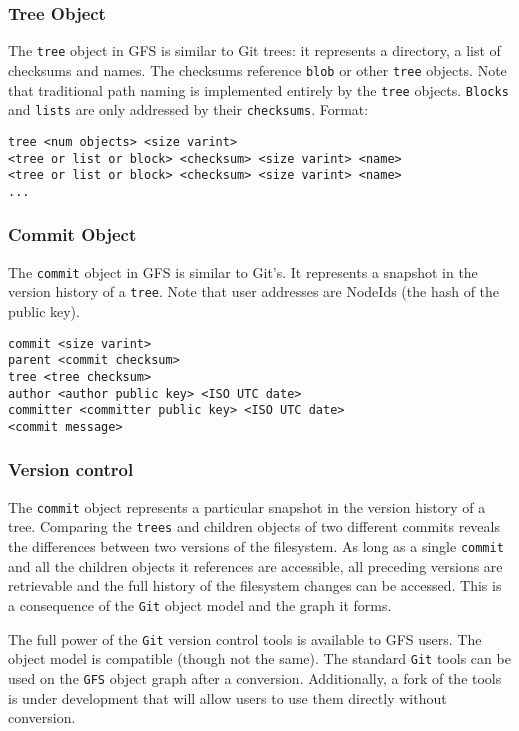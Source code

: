 \documentclass{sig-alternate}
\begin{document}
\subsubsection{Tree Object}

The \texttt{tree} object in GFS is similar to Git trees: it represents a
directory, a list of checksums and names. The checksums reference \texttt{blob}
or other \texttt{tree} objects. Note that traditional path naming
is implemented entirely by the \texttt{tree} objects. \texttt{Blocks} and
\texttt{lists} are only addressed by their \texttt{checksums}.
Format:
\begin{verbatim}
tree <num objects> <size varint>
<tree or list or block> <checksum> <size varint> <name>
<tree or list or block> <checksum> <size varint> <name>
...
\end{verbatim}

\subsubsection{Commit Object}

The \texttt{commit} object in GFS is similar to Git's. It represents a
snapshot in the version history of a \texttt{tree}. Note that user
addresses are NodeIds (the hash of the public key).

\begin{verbatim}
commit <size varint>
parent <commit checksum>
tree <tree checksum>
author <author public key> <ISO UTC date>
committer <committer public key> <ISO UTC date>
<commit message>
\end{verbatim}

\subsubsection{Version control}

The \texttt{commit} object represents a particular snapshot in the version
history of a tree. Comparing the \texttt{trees} and children objects of two
different commits reveals the differences between two versions of the
filesystem. As long as a single \texttt{commit} and all the children objects
it references are accessible, all preceding versions are retrievable and the
full history of the filesystem changes can be accessed. This is a consequence
of the \texttt{Git} object model and the graph it forms.

The full power of the \texttt{Git} version control tools is available to GFS
users. The object model is compatible (though not the same). The standard
\texttt{Git} tools can be used on the \texttt{GFS} object graph after a
conversion. Additionally, a fork of the tools is under development that will
allow users to use them directly without conversion.
\end{document}
